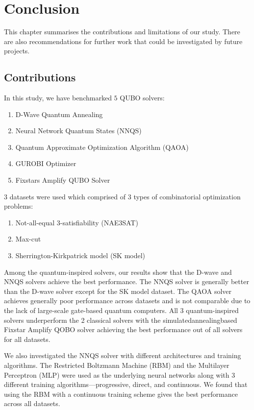 \chapter{Conclusion}

This chapter summarises the contributions and limitations of our study. There are also recommendations for further work that could be investigated by future projects.

\section{Contributions}
In this study, we have benchmarked $5$ QUBO solvers:
\begin{enumerate}
    \item D-Wave Quantum Annealing
    \item Neural Network Quantum States (NNQS)
    \item Quantum Approximate Optimization Algorithm (QAOA)
    \item GUROBI Optimizer
    \item Fixstars Amplify QUBO Solver
\end{enumerate}
$3$ datasets were used which comprised of $3$ types of combinatorial optimization problems:
\begin{enumerate}
    \item Not-all-equal 3-satisfiability (NAE3SAT)
    \item Max-cut
    \item Sherrington-Kirkpatrick model (SK model)
\end{enumerate}
Among the quantum-inspired solvers, our results show that the D-wave and NNQS solvers achieve the best performance. The NNQS solver is generally better than the D-wave solver except for the SK model dataset. The QAOA solver achieves generally poor performance across datasets and is not comparable due to the lack of large-scale gate-based quantum computers. All 3 quantum-inspired solvers underperform the 2 classical solvers with the simulated\-annealing\-based Fixstar Amplify QOBO solver achieving the best performance out of all solvers for all datasets.

We also investigated the NNQS solver with different architectures and training algorithms. The Restricted Boltzmann Machine (RBM) and the Multilayer Perceptron (MLP) were used as the underlying neural networks along with $3$ different training algorithms---progressive, direct, and continuous. We found that using the RBM with a continuous training scheme gives the best performance across all datasets.

